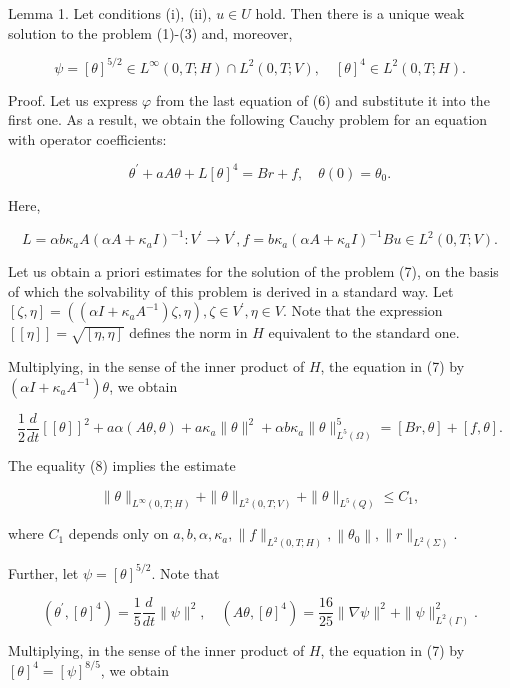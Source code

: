 \documentclass[10pt]{article}
\begin{document}
Lemma 1. Let conditions (i), (ii), $u \in U$ hold. Then there is a unique weak solution to the problem (1)-(3) and, moreover,

$$
\psi=[\theta]^{5 / 2} \in L^{\infty}(0, T ; H) \cap L^{2}(0, T ; V), \quad[\theta]^{4} \in L^{2}(0, T ; H) .
$$

Proof. Let us express $\varphi$ from the last equation of (6) and substitute it into the first one. As a result, we obtain the following Cauchy problem for an equation with operator coefficients:

$$
\theta^{\prime}+a A \theta+L[\theta]^{4}=B r+f, \quad \theta(0)=\theta_{0} .
$$

Here,

$$
L=\alpha b \kappa_{a} A\left(\alpha A+\kappa_{a} I\right)^{-1}: V^{\prime} \rightarrow V^{\prime}, f=b \kappa_{a}\left(\alpha A+\kappa_{a} I\right)^{-1} B u \in L^{2}(0, T ; V) .
$$

Let us obtain a priori estimates for the solution of the problem (7), on the basis of which the solvability of this problem is derived in a standard way. Let $[\zeta, \eta]=\left(\left(\alpha I+\kappa_{a} A^{-1}\right) \zeta, \eta\right), \zeta \in V^{\prime}, \eta \in V$. Note that the expression $[[\eta]]=\sqrt{[\eta, \eta]}$ defines the norm in $H$ equivalent to the standard one.

Multiplying, in the sense of the inner product of $H$, the equation in (7) by $\left(\alpha I+\kappa_{a} A^{-1}\right) \theta$, we obtain

$$
\frac{1}{2} \frac{d}{d t}[[\theta]]^{2}+a \alpha(A \theta, \theta)+a \kappa_{a}\|\theta\|^{2}+\alpha b \kappa_{a}\|\theta\|_{L^{5}(\Omega)}^{5}=[B r, \theta]+[f, \theta] .
$$

The equality (8) implies the estimate

$$
\|\theta\|_{L^{\infty}(0, T ; H)}+\|\theta\|_{L^{2}(0, T ; V)}+\|\theta\|_{L^{5}(Q)} \leq C_{1},
$$

where $C_{1}$ depends only on $a, b, \alpha, \kappa_{a},\|f\|_{L^{2}(0, T ; H)},\left\|\theta_{0}\right\|,\|r\|_{L^{2}(\Sigma)}$.

Further, let $\psi=[\theta]^{5 / 2}$. Note that

$$
\left(\theta^{\prime},[\theta]^{4}\right)=\frac{1}{5} \frac{d}{d t}\|\psi\|^{2}, \quad\left(A \theta,[\theta]^{4}\right)=\frac{16}{25}\|\nabla \psi\|^{2}+\|\psi\|_{L^{2}(\Gamma)}^{2} .
$$

Multiplying, in the sense of the inner product of $H$, the equation in (7) by $[\theta]^{4}=[\psi]^{8 / 5}$, we obtain
\end{document}
